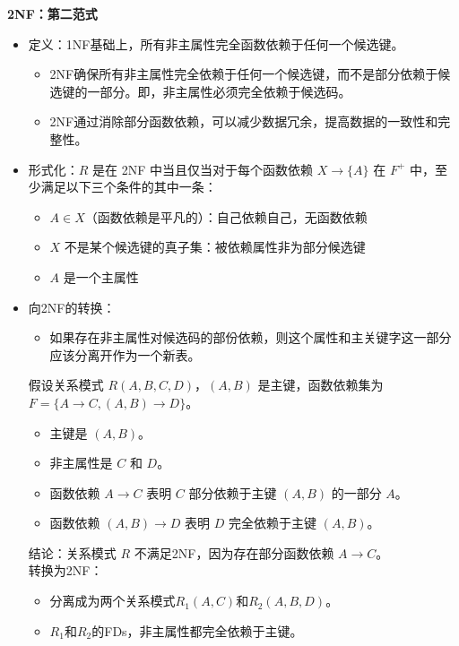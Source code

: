 \documentclass[b5paper, twoside]{article}
\let\oldtextbf\textbf
\renewcommand{\textbf}[1]{\textcolor{myblue}{\oldtextbf{#1}}}
\newenvironment{smallmdframed}
  {\begin{mdframed}[linewidth=0pt, backgroundcolor=pink!20]\small}
  {\end{mdframed}}
\begin{document}
\textbf{2NF：第二范式}
\begin{itemize}
    \item 定义：1NF基础上，所有非主属性完全函数依赖于任何一个候选键。
    \begin{itemize}
        \item 2NF确保所有非主属性完全依赖于任何一个候选键，而不是部分依赖于候选键的一部分。即，非主属性必须完全依赖于候选码。
        \item 2NF通过消除部分函数依赖，可以减少数据冗余，提高数据的一致性和完整性。
    \end{itemize}
    \item 形式化：$R$ 是在 2NF 中当且仅当对于每个函数依赖 $X \rightarrow \{A\}$ 在 $F^+$ 中，至少满足以下三个条件的其中一条：
    \begin{itemize}
        \item $A \in X$（函数依赖是平凡的）：自己依赖自己，无函数依赖
        \item $X$ 不是某个候选键的真子集：被依赖属性非为部分候选键
        \item $A$ 是一个主属性
    \end{itemize}
    \item 向2NF的转换：
    \begin{itemize}
        \item 如果存在非主属性对候选码的部份依赖，则这个属性和主关键字这一部分应该分离开作为一个新表。
    \end{itemize}
\begin{smallmdframed}
假设关系模式 $R(A, B, C, D)$，$(A, B)$ 是主键，函数依赖集为 $F = \{A \rightarrow C, (A, B) \rightarrow D\}$。

\begin{itemize}
        \item 主键是 $(A, B)$。
        \item 非主属性是 $C$ 和 $D$。
        \item 函数依赖 $A \rightarrow C$ 表明 $C$ 部分依赖于主键 $(A, B)$ 的一部分 $A$。
        \item 函数依赖 $(A, B) \rightarrow D$ 表明 $D$ 完全依赖于主键 $(A, B)$。
\end{itemize}
结论：关系模式 $R$ 不满足2NF，因为存在部分函数依赖 $A \rightarrow C$。
\\转换为2NF：
\begin{itemize}
    \item 分离成为两个关系模式$R_1(A,C)$和$R_2(A,B,D)$。
    \item $R_1$和$R_2$的FDs，非主属性都完全依赖于主键。
\end{itemize}
\end{smallmdframed}
\end{itemize}
\end{document}
